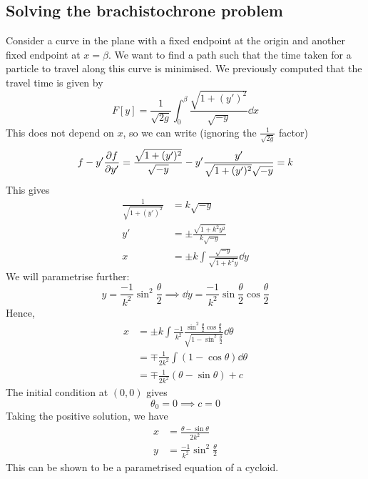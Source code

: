 \subsection{Solving the brachistochrone problem}
Consider a curve in the plane with a fixed endpoint at the origin and another fixed endpoint at \(x = \beta\).
We want to find a path such that the time taken for a particle to travel along this curve is minimised.
We previously computed that the travel time is given by
\[
	F[y] = \frac{1}{\sqrt{2g}} \int_0^\beta \frac{\sqrt{1 + (y')^2}}{\sqrt{-y}} \dd{x}
\]
This does not depend on \(x\), so we can write (ignoring the \( \frac{1}{\sqrt{2g}} \) factor)
\[
	f - y' \pdv{f}{y'} = \frac{\sqrt{1 + (y')^2}}{\sqrt{-y}} - y' \frac{y'}{\sqrt{1 + (y')^2} \sqrt{-y}} = k
\]
This gives
\begin{align*}
	\frac{1}{\sqrt{1 + (y')^2}} & = k \sqrt{-y}                                          \\
	y'                          & = \pm \frac{\sqrt{1 + k^2 y^2}}{k\sqrt{-y}}            \\
	x                           & = \pm k \int \frac{\sqrt{-y}}{\sqrt{1 + k^2 y}} \dd{y}
\end{align*}
We will parametrise further:
\[
	y = \frac{-1}{k^2} \sin^2 \frac{\theta}{2} \implies \dd{y} = \frac{-1}{k^2}\sin \frac{\theta}{2} \cos\frac{\theta}{2}
\]
Hence,
\begin{align*}
	x & = \pm k \int \frac{-1}{k^2} \frac{\sin^2 \frac{\theta}{2} \cos \frac{\theta}{2}}{\sqrt{1 - \sin^2 \frac{\theta}{2}}} \dd{\theta} \\
	  & = \mp \frac{1}{2k^2} \int (1 - \cos\theta) \dd{\theta}                                                                           \\
	  & = \mp \frac{1}{2k^2}(\theta - \sin\theta) + c
\end{align*}
The initial condition at \((0, 0)\) gives
\[
	\theta_0 = 0 \implies c = 0
\]
Taking the positive solution, we have
\begin{align*}
	x & = \frac{\theta - \sin\theta}{2k^2}       \\
	y & = \frac{-1}{k^2} \sin^2 \frac{\theta}{2}
\end{align*}
This can be shown to be a parametrised equation of a cycloid.

